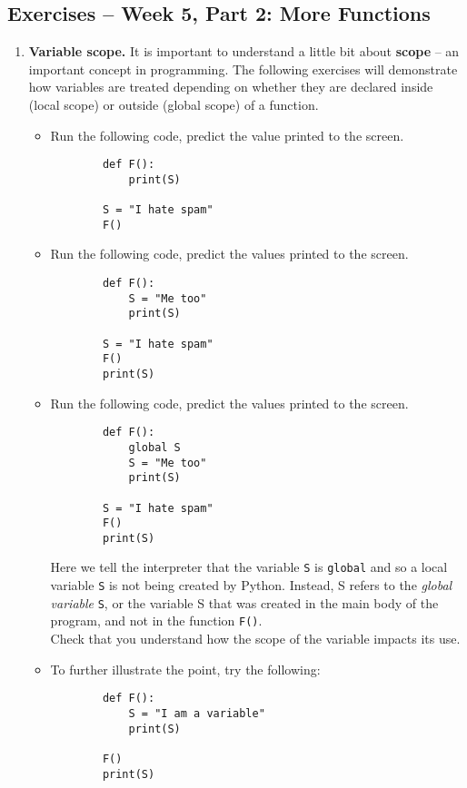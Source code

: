\documentclass[11pt]{report}
\begin{document}
\subsection*{Exercises -- Week 5, Part 2: More Functions}
\begin{enumerate}
	\item \textbf{Variable scope.} It is important to understand a little bit about \textbf{scope} -- an important concept in programming. The following exercises will demonstrate how variables are treated depending on whether they are declared inside (local scope) or outside (global scope) of a function.
	\begin{itemize}
		\item Run the following code, predict the value printed to the screen.
		\begin{verbatim}
		def F():
		    print(S)

		S = "I hate spam"
		F()
		\end{verbatim}

		\item Run the following code, predict the values printed to the screen.
		\begin{verbatim}
		def F():
		    S = "Me too"
		    print(S)

		S = "I hate spam"
		F()
		print(S)
		\end{verbatim}

		\item Run the following code, predict the values printed to the screen.
		\begin{verbatim}
		def F():
		    global S
		    S = "Me too"
		    print(S)

		S = "I hate spam"
		F()
		print(S)
		\end{verbatim}

		Here we tell the interpreter that the variable {\tt S} is {\tt global} and so a local variable {\tt S} is not being created by Python. Instead, S refers to the \emph{global variable} {\tt S}, or the variable S that was created in the main body of the program, and not in the function {\tt F()}.\\
		Check that you understand how the scope of the variable impacts its use.

		\item To further illustrate the point, try the following:
		\begin{verbatim}
		def F():
		    S = "I am a variable"
		    print(S)

		F()
		print(S)
		\end{verbatim}


\end{itemize}
\end{enumerate}
\end{document}
